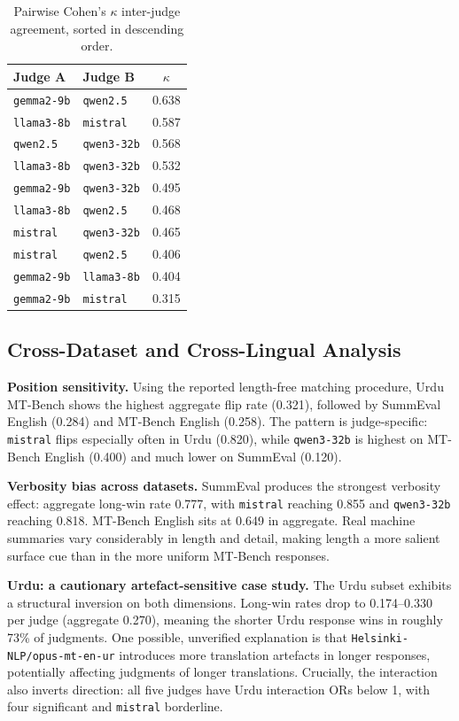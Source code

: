 \documentclass[10pt,conference]{IEEEtran}
\begin{document}
\begin{table}[t]
\caption{Pairwise Cohen's $\kappa$ inter-judge agreement, sorted in descending order.}
\label{tab:kappa}
\centering
\footnotesize
\begin{tabular}{@{}llc@{}}
\toprule
Judge A & Judge B & $\kappa$ \\
\midrule
\texttt{gemma2-9b} & \texttt{qwen2.5} & 0.638 \\
\texttt{llama3-8b} & \texttt{mistral} & 0.587 \\
\texttt{qwen2.5} & \texttt{qwen3-32b} & 0.568 \\
\texttt{llama3-8b} & \texttt{qwen3-32b} & 0.532 \\
\texttt{gemma2-9b} & \texttt{qwen3-32b} & 0.495 \\
\texttt{llama3-8b} & \texttt{qwen2.5} & 0.468 \\
\texttt{mistral} & \texttt{qwen3-32b} & 0.465 \\
\texttt{mistral} & \texttt{qwen2.5} & 0.406 \\
\texttt{gemma2-9b} & \texttt{llama3-8b} & 0.404 \\
\texttt{gemma2-9b} & \texttt{mistral} & 0.315 \\
\bottomrule
\end{tabular}
\end{table}

\subsection{Cross-Dataset and Cross-Lingual Analysis}
\label{sec:cross}
\textbf{Position sensitivity.} Using the reported length-free matching procedure, Urdu MT-Bench shows the highest aggregate flip rate (0.321), followed by SummEval English (0.284) and MT-Bench English (0.258). The pattern is judge-specific: \texttt{mistral} flips especially often in Urdu (0.820), while \texttt{qwen3-32b} is highest on MT-Bench English (0.400) and much lower on SummEval (0.120).

\textbf{Verbosity bias across datasets.} SummEval produces the strongest verbosity effect: aggregate long-win rate 0.777, with \texttt{mistral} reaching 0.855 and \texttt{qwen3-32b} reaching 0.818. MT-Bench English sits at 0.649 in aggregate. Real machine summaries vary considerably in length and detail, making length a more salient surface cue than in the more uniform MT-Bench responses.

\textbf{Urdu: a cautionary artefact-sensitive case study.} The Urdu subset exhibits a structural inversion on both dimensions. Long-win rates drop to 0.174--0.330 per judge (aggregate 0.270), meaning the shorter Urdu response wins in roughly 73\% of judgments. One possible, unverified explanation is that \texttt{Helsinki-NLP/opus-mt-en-ur} introduces more translation artefacts in longer responses, potentially affecting judgments of longer translations. Crucially, the interaction also inverts direction: all five judges have Urdu interaction ORs below 1, with four significant and \texttt{mistral} borderline.
\end{document}
